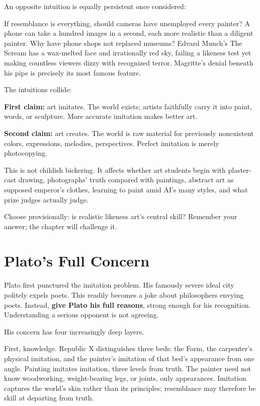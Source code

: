 An opposite intuition is equally persistent once considered:

If resemblance is everything, should cameras have unemployed every painter? A phone can take a hundred images in a second, each more realistic than a diligent painter. Why have phone shops not replaced museums? Edvard Munch's The Scream has a wax-melted face and irrationally red sky, failing a likeness test yet making countless viewers dizzy with recognized terror. Magritte's denial beneath his pipe is precisely its most famous feature.

The intuitions collide:

\textbf{First claim:} art imitates. The world exists; artists faithfully carry it into paint, words, or sculpture. More accurate imitation makes better art.

\textbf{Second claim:} art creates. The world is raw material for previously nonexistent colors, expressions, melodies, perspectives. Perfect imitation is merely photocopying.

This is not childish bickering. It affects whether art students begin with plaster-cast drawing, photographs' truth compared with paintings, abstract art as supposed emperor's clothes, learning to paint amid AI's many styles, and what prize judges actually judge.

Choose provisionally: is realistic likeness art's central skill? Remember your answer; the chapter will challenge it.

\section{Plato's Full Concern}
Plato first punctured the imitation problem. His famously severe ideal city politely expels poets. This readily becomes a joke about philosophers envying poets. Instead, \textbf{give Plato his full reasons}, strong enough for his recognition. Understanding a serious opponent is not agreeing.

His concern has four increasingly deep layers.

First, knowledge. Republic X distinguishes three beds: the Form, the carpenter's physical imitation, and the painter's imitation of that bed's appearance from one angle. Painting imitates imitation, three levels from truth. The painter need not know woodworking, weight-bearing legs, or joints, only appearances. Imitation captures the world's skin rather than its principles; resemblance may therefore be skill at departing from truth.


